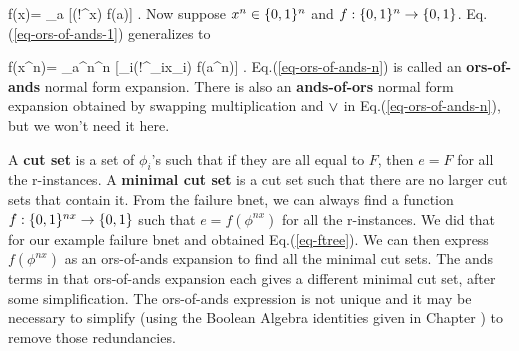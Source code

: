 \beq
f(x)= \V_{a\in\bool} [(!^{}x) f(a)]
\label{eq-ors-of-ands-1}
\;.
\eeq
Now suppose $x^n\in \{0,1\}^n$
and $f:\{0,1\}^n\rightarrow \{0,1\}$.
Eq.(\ref{eq-ors-of-ands-1})
generalizes to

\beq
f(x^n)= \V_{a^n\in\bool^n}
 [\prod_i(!^{_i}x_i) f(a^n)]
\label{eq-ors-of-ands-n}
\;.
\eeq
Eq.(\ref{eq-ors-of-ands-n})
is called an {\bf ors-of-ands} normal form 
expansion.
There is also an {\bf ands-of-ors} normal
form expansion 
obtained by swapping multiplication
and $\vee$
in Eq.(\ref{eq-ors-of-ands-n}), 
but we won't need it here.

A {\bf cut
set} is a set
of $\phi_i$'s such that
if they are all equal to $F$,
then $e=F$ for all the
r-instances.
A {\bf minimal cut set}
is a cut set such that there
are no larger cut sets that contain it.
From the failure bnet,
we can always find 
a function $f:\{0,1\}^{nx}\rightarrow\{0,1\}$
such that
$e=f(\phi^{nx})$
for all the r-instances.
We did that for our
example failure
bnet and obtained Eq.(\ref{eq-ftree}).
We can
then
express 
$f(\phi^{nx})$ as an ors-of-ands expansion
to find all the minimal cut sets.
The ands
terms in that ors-of-ands
expansion 
each gives
a different minimal cut set,
after some simplification.
The ors-of-ands
expression
is not unique
and it may be necessary to simplify 
(using the Boolean Algebra identities
given in Chapter )
to remove those redundancies.